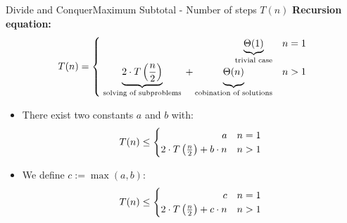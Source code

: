 



\begin{frame}{Divide and Conquer}{Maximum Subtotal - Number of steps $T(n)$}
  \textbf{Recursion equation:} 
  \begin{displaymath}
    T(n) = \begin{cases}
      \hfill \underbrace{\Theta(1)}_\text{trivial case} & n = 1\\
      \underbrace{2 \cdot T\left(\frac{n}{2}\right)}_\text{
        solving of subproblems
      } + \underbrace{
        \Theta(n)
        \vphantom{\left(\frac{n}{2}\right)}
      }_\text{cobination of solutions} & n > 1
    \end{cases}
  \end{displaymath}
    \begin{itemize}
    \item<2->
      There exist two constants $a$ and $b$ with:
      \begin{displaymath}
        T(n) \leq \begin{cases}
          \hfill a & n = 1\\
          2 \cdot T\left(\frac{n}{2}\right) + b \cdot n & n > 1
        \end{cases}
      \end{displaymath}
    \item<3->
      We define $c := \max(a,b)$:
      \begin{displaymath}
        T(n) \leq \begin{cases}
          \hfill c & n = 1\\
          2 \cdot T\left(\frac{n}{2}\right) + c \cdot n & n > 1
        \end{cases}
      \end{displaymath}
  \end{itemize}
\end{frame}

